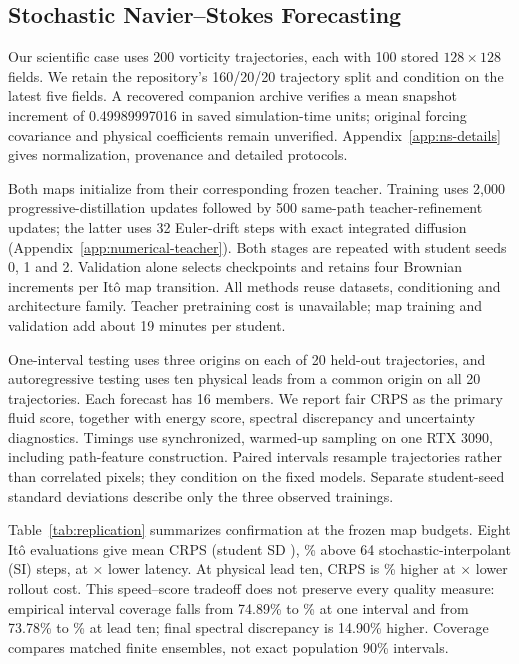 \subsection{Stochastic Navier--Stokes Forecasting}
Our scientific case uses 200 vorticity trajectories, each with 100 stored $128\times128$ fields. We retain the repository's 160/20/20 trajectory split and condition on the latest five fields. A recovered companion archive verifies a mean snapshot increment of 0.49989997016 in saved simulation-time units; original forcing covariance and physical coefficients remain unverified. Appendix~\ref{app:ns-details} gives normalization, provenance and detailed protocols.

Both maps initialize from their corresponding frozen teacher. Training uses 2,000 progressive-distillation updates followed by 500 same-path teacher-refinement updates; the latter uses 32 Euler-drift steps with exact integrated diffusion (Appendix~\ref{app:numerical-teacher}). Both stages are repeated with student seeds 0, 1 and 2. Validation alone selects checkpoints and retains four Brownian increments per It\^o map transition. All methods reuse datasets, conditioning and architecture family. Teacher pretraining cost is unavailable; map training and validation add about 19 minutes per student.

One-interval testing uses three origins on each of 20 held-out trajectories, and autoregressive testing uses ten physical leads from a common origin on all 20 trajectories. Each forecast has 16 members. We report fair CRPS as the primary fluid score, together with energy score, spectral discrepancy and uncertainty diagnostics. Timings use synchronized, warmed-up sampling on one RTX 3090, including path-feature construction. Paired intervals resample trajectories rather than correlated pixels; they condition on the fixed models. Separate student-seed standard deviations describe only the three observed trainings.


Table~\ref{tab:replication} summarizes confirmation at the frozen map budgets. Eight It\^o evaluations give mean CRPS \repItoEightIntervalCRPS{} (student SD \repItoEightIntervalSD), \repItoEightIntervalPercent\% above 64 stochastic-interpolant (SI) steps, at \repItoEightIntervalSpeed$\times$ lower latency. At physical lead ten, CRPS is \repItoEightRollPercent\% higher at \repItoEightRollSpeed$\times$ lower rollout cost. This speed--score tradeoff does not preserve every quality measure: empirical interval coverage falls from 74.89\% to \repItoEightIntervalCoverage\% at one interval and from 73.78\% to \repItoEightRollCoverage\% at lead ten; final spectral discrepancy is 14.90\% higher. Coverage compares matched finite ensembles, not exact population 90\% intervals.

